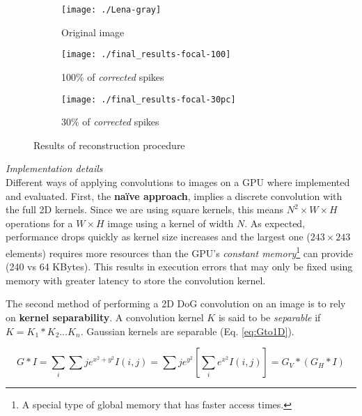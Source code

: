 \begin{figure}[hbt]
  \centering
  \begin{subfigure}[t]{0.3\textwidth}
    \centering
    \captionsetup{justification=centering,margin=0.1cm}
    \texttt{[image: ./Lena-gray]}
    \caption{Original image}
    \label{pic-original-lena}
  \end{subfigure}
  \begin{subfigure}[t]{0.3\textwidth}
    \centering
    \captionsetup{justification=centering,margin=0.1cm}
    \texttt{[image: ./final\_results-focal-100]}
    \caption{100\% of \emph{corrected} spikes}
    \label{pic-100pc-spikes}
  \end{subfigure}
  \begin{subfigure}[t]{0.3\textwidth}
    \centering
    \captionsetup{justification=centering,margin=0.1cm}
    \texttt{[image: ./final\_results-focal-30pc]}
    \caption{30\% of \emph{corrected} spikes}
    \label{pic-30pc-spikes}
  \end{subfigure}
  \caption{Results of reconstruction procedure}
  \label{fig-reconstruction}
  \vspace*{-10pt}
\end{figure}
\vspace*{0.5cm}

\hspace*{-0.65cm}\emph{Implementation details}\\[0.3cm]
Different ways of applying convolutions to images on a GPU where implemented and evaluated. First, the \textbf{naïve approach}, implies a discrete convolution with the full 2D kernels. Since we are using square kernels, this means $N^2 \times W \times H$ operations for a $W\times H$ image using a kernel of width $N$. As expected, performance drops quickly as kernel size increases and the largest one ($243\times243$ elements) requires more resources than the GPU's \emph{constant memory}\footnote{A special type of global memory that has faster access times.} can provide (240 vs 64 KBytes). This results in execution errors that may only be fixed using memory with greater latency to store the convolution kernel. 


The second method of performing a 2D DoG convolution on an image is to rely on \textbf{kernel separability}. A convolution kernel $K$ is said to be \emph{separable} if $K = K_{1} \ast K_{2} \dots K_{n}$. Gaussian kernels are separable (Eq. \ref{eq:Gto1D}). 

\begin{equation}
  G \ast I = \sum_{i} \sum{j} e^{x^2 + y^2}I(i, j)  = \sum{j} e^{y^2}\left[ \sum_{i} e^{x^2}I(i, j) \right] = G_V \ast ( G_H \ast I)
  \label{eq:Gto1D}
\end{equation}

